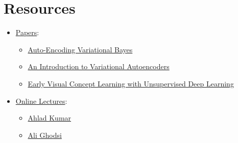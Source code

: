 \documentclass[12pt]{report}
\begin{document}
\section*{Resources}
\begin{itemize}
    \item \underline{Papers}:
        \begin{itemize}
            \item \href{https://arxiv.org/abs/1312.6114}
                       {Auto-Encoding Variational Bayes}
            \item \href{https://arxiv.org/abs/1906.02691}
                       {An Introduction to Variational Autoencoders}
            \item \href{https://arxiv.org/pdf/1606.05579}
                       {Early Visual Concept Learning with Unsupervised Deep Learning}
        \end{itemize}
    \item \underline{Online Lectures}:
        \begin{itemize}
            \item \href{https://www.youtube.com/watch?v=w8F7_rQZxXk&list=PLdxQ7SoC
                        LQANizknbIiHzL_hYjEaI-wUe}{Ahlad Kumar}
            \item \href{https://www.youtube.com/watch?v=uaaqyVS9-rM}{Ali Ghodsi}
        \end{itemize}
\end{itemize}
\end{document}
